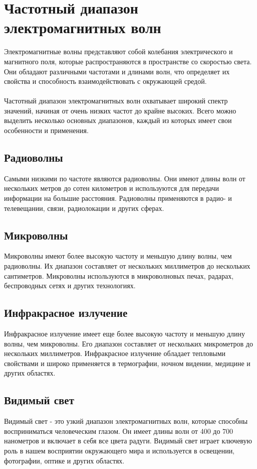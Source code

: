 \documentclass{article}
\begin{document}
\newpage
\section{Частотный диапазон электромагнитных волн}
Электромагнитные волны представляют собой колебания электрического и магнитного поля, которые распространяются в пространстве со скоростью света. Они обладают различными частотами и длинами волн, что определяет их свойства и способность взаимодействовать с окружающей средой.\\
~\\
Частотный диапазон электромагнитных волн охватывает широкий спектр значений, начиная от очень низких частот до крайне высоких. Всего можно выделить несколько основных диапазонов, каждый из которых имеет свои особенности и применения.
\subsection{Радиоволны}
Самыми низкими по частоте являются радиоволны. Они имеют длины волн от нескольких метров до сотен километров и используются для передачи информации на большие расстояния. Радиоволны применяются в радио- и телевещании, связи, радиолокации и других сферах.
\subsection{Микроволны}
Микроволны имеют более высокую частоту и меньшую длину волны, чем радиоволны. Их диапазон составляет от нескольких миллиметров до нескольких сантиметров. Микроволны используются в микроволновых печах, радарах, беспроводных сетях и других технологиях.
\subsection{Инфракрасное излучение}
Инфракрасное излучение имеет еще более высокую частоту и меньшую длину волны, чем микроволны. Его диапазон составляет от нескольких микрометров до нескольких миллиметров. Инфракрасное излучение обладает тепловыми свойствами и широко применяется в термографии, ночном видении, медицине и других областях.
\subsection{Видимый свет}
Видимый свет - это узкий диапазон электромагнитных волн, которые способны восприниматься человеческим глазом. Он имеет длины волн от 400 до 700 нанометров и включает в себя все цвета радуги. Видимый свет играет ключевую роль в нашем восприятии окружающего мира и используется в освещении, фотографии, оптике и других областях.
\end{document}
